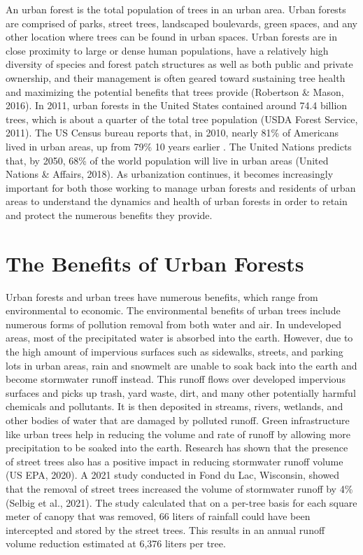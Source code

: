 \documentclass[12pt,twoside]{reedthesis}
\begin{document}
An urban forest is the total population of trees in an urban area. Urban forests are comprised of parks, street trees, landscaped boulevards, green spaces, and any other location where trees can be found in urban spaces. Urban forests are in close proximity to large or dense human populations, have a relatively high diversity of species and forest patch structures as well as both public and private ownership, and their management is often geared toward sustaining tree health and maximizing the potential benefits that trees provide (Robertson \& Mason, 2016). In 2011, urban forests in the United States contained around 74.4 billion trees, which is about a quarter of the total tree population (USDA Forest Service, 2011). The US Census bureau reports that, in 2010, nearly 81\% of Americans lived in urban areas, up from 79\% 10 years earlier . The United Nations predicts that, by 2050, 68\% of the world population will live in urban areas (United Nations \& Affairs, 2018). As urbanization continues, it becomes increasingly important for both those working to manage urban forests and residents of urban areas to understand the dynamics and health of urban forests in order to retain and protect the numerous benefits they provide.

\hypertarget{the-benefits-of-urban-forests}{%
\section{The Benefits of Urban Forests}\label{the-benefits-of-urban-forests}}

Urban forests and urban trees have numerous benefits, which range from environmental to economic. The environmental benefits of urban trees include numerous forms of pollution removal from both water and air. In undeveloped areas, most of the precipitated water is absorbed into the earth. However, due to the high amount of impervious surfaces such as sidewalks, streets, and parking lots in urban areas, rain and snowmelt are unable to soak back into the earth and become stormwater runoff instead. This runoff flows over developed impervious surfaces and picks up trash, yard waste, dirt, and many other potentially harmful chemicals and pollutants. It is then deposited in streams, rivers, wetlands, and other bodies of water that are damaged by polluted runoff. Green infrastructure like urban trees help in reducing the volume and rate of runoff by allowing more precipitation to be soaked into the earth. Research has shown that the presence of street trees also has a positive impact in reducing stormwater runoff volume (US EPA, 2020). A 2021 study conducted in Fond du Lac, Wisconsin, showed that the removal of street trees increased the volume of stormwater runoff by 4\% (Selbig et al., 2021). The study calculated that on a per-tree basis for each square meter of canopy that was removed, 66 liters of rainfall could have been intercepted and stored by the street trees. This results in an annual runoff volume reduction estimated at 6,376 liters per tree.
\end{document}
